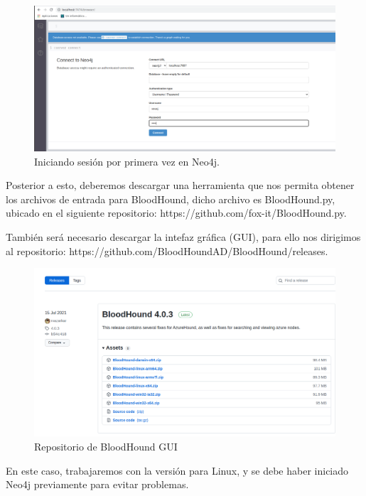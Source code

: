 \documentclass{article}
\begin{document}
\begin{figure}[H]
	\center
	\includegraphics[width=\textwidth]{images/forest/primeraconexionNeo4j.png}
	\caption{Iniciando sesión por primera vez en Neo4j.}
\end{figure}

Posterior a esto, deberemos descargar una herramienta que nos permita obtener los archivos de entrada para BloodHound, dicho archivo es BloodHound.py, ubicado en el siguiente repositorio: https://github.com/fox-it/BloodHound.py.

También será necesario descargar la intefaz gráfica (GUI), para ello nos dirigimos al repositorio: https://github.com/BloodHoundAD/BloodHound/releases. 

\begin{figure}[H]
	\center
	\includegraphics[width=\textwidth]{images/forest/descargando-elgui.png}
	\caption{Repositorio de BloodHound GUI}
\end{figure}

En este caso, trabajaremos con la versión para Linux, y se debe haber iniciado Neo4j previamente para evitar problemas. 
\end{document}
